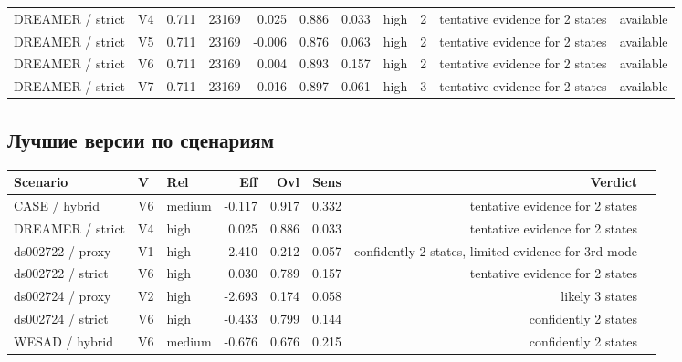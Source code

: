 \documentclass[11pt,a4paper]{article}
\begin{document}
\begin{landscape}
\begin{longtable}{p{2.8cm}p{0.8cm}rrrrrp{1.2cm}rp{4.4cm}p{1.6cm}}
DREAMER / strict & V4 & 0.711 & 23169 & 0.025 & 0.886 & 0.033 & high & 2 & tentative evidence for 2 states & available \\
DREAMER / strict & V5 & 0.711 & 23169 & -0.006 & 0.876 & 0.063 & high & 2 & tentative evidence for 2 states & available \\
DREAMER / strict & V6 & 0.711 & 23169 & 0.004 & 0.893 & 0.157 & high & 2 & tentative evidence for 2 states & available \\
DREAMER / strict & V7 & 0.711 & 23169 & -0.016 & 0.897 & 0.061 & high & 3 & tentative evidence for 2 states & available \\
\bottomrule
\end{longtable}
\normalsize
\end{landscape}

\subsection*{Лучшие версии по сценариям}
\begin{center}
\begin{tabular}{p{2.8cm}p{0.8cm}p{1.3cm}rrrrp{4.2cm}}
\toprule
Scenario & V & Rel & Eff & Ovl & Sens & Verdict \\
\midrule
CASE / hybrid & V6 & medium & -0.117 & 0.917 & 0.332 & tentative evidence for 2 states \\
DREAMER / strict & V4 & high & 0.025 & 0.886 & 0.033 & tentative evidence for 2 states \\
ds002722 / proxy & V1 & high & -2.410 & 0.212 & 0.057 & confidently 2 states, limited evidence for 3rd mode \\
ds002722 / strict & V6 & high & 0.030 & 0.789 & 0.157 & tentative evidence for 2 states \\
ds002724 / proxy & V2 & high & -2.693 & 0.174 & 0.058 & likely 3 states \\
ds002724 / strict & V6 & high & -0.433 & 0.799 & 0.144 & confidently 2 states \\
WESAD / hybrid & V6 & medium & -0.676 & 0.676 & 0.215 & confidently 2 states \\
\bottomrule
\end{tabular}
\end{center}
\end{document}
